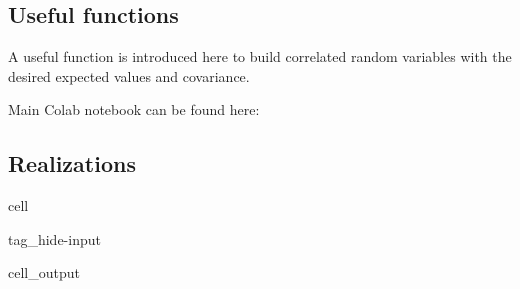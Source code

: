 \documentclass[letterpaper,10pt,english]{jupyterBook}
\begin{document}
\subsection{Useful functions}
\label{\detokenize{code/notebooks/rebalancing:useful-functions}}
\sphinxAtStartPar
A useful function is introduced here to build correlated random variables with the desired expected values and covariance.

\sphinxAtStartPar
Main Colab notebook can be found here: 


\subsection{Realizations}
\label{\detokenize{code/notebooks/rebalancing:realizations}}
\begin{sphinxuseclass}{cell}
\begin{sphinxuseclass}{tag_hide-input}\begin{sphinxVerbatimOutput}

\begin{sphinxuseclass}{cell_output}
\begin{sphinxVerbatim}
\end{sphinxVerbatim}

\noindent{}

\end{sphinxuseclass}\end{sphinxVerbatimOutput}

\end{sphinxuseclass}
\end{sphinxuseclass}
\end{document}
